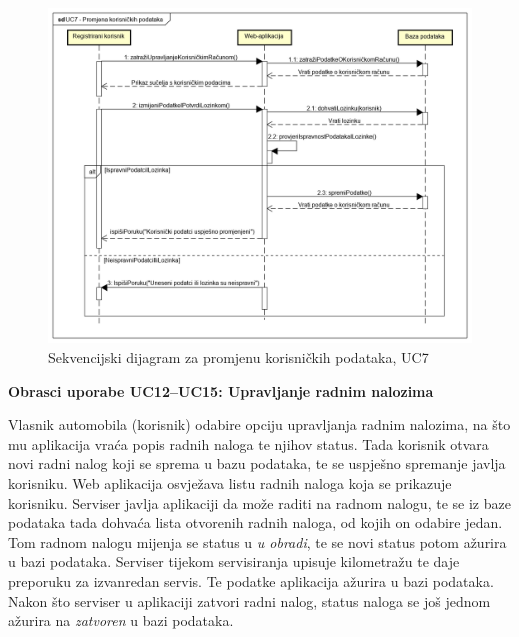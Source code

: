 \begin{figure}[H]
	\includegraphics[width=0.9\linewidth]{dijagrami/seq-dia-UC7.png}
	\centering
	\caption{Sekvencijski dijagram za promjenu korisničkih podataka, UC7}
	\label{fig:sequence-diagram1}
\end{figure}

\eject

\noindent \textbf{Obrasci uporabe UC12--UC15: Upravljanje radnim nalozima}
	
\noindent Vlasnik automobila (korisnik) odabire opciju upravljanja radnim nalozima, na što mu aplikacija vraća popis radnih naloga te njihov status. Tada korisnik otvara novi radni nalog koji se sprema u bazu podataka, te se uspješno spremanje javlja korisniku. Web aplikacija osvježava listu radnih naloga koja se prikazuje korisniku. Serviser javlja aplikaciji da može raditi na radnom nalogu, te se iz baze podataka tada dohvaća lista otvorenih radnih naloga, od kojih on odabire jedan. Tom radnom nalogu mijenja se status u \textit{u obradi}, te se novi status potom ažurira u bazi podataka. Serviser tijekom servisiranja upisuje kilometražu te daje preporuku za izvanredan servis. Te podatke aplikacija ažurira u bazi podataka. Nakon što serviser u aplikaciji zatvori radni nalog, status naloga se još jednom ažurira na \textit{zatvoren} u bazi podataka.
	
